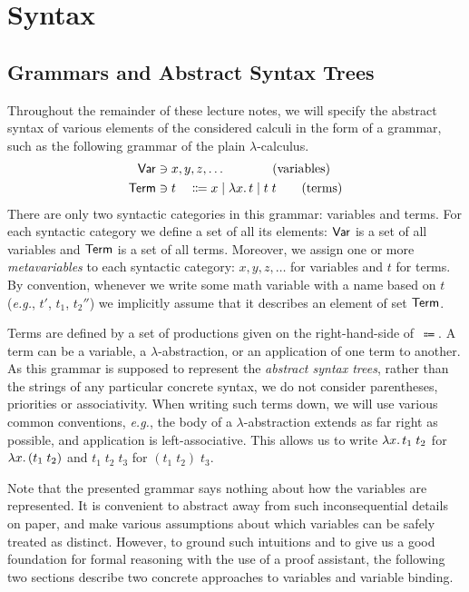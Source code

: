 \chapter{Syntax}

\section{Grammars and Abstract Syntax Trees}

Throughout the remainder of these lecture notes, we will specify the abstract
syntax of various elements of the considered calculi in the form of a grammar,
such as the following grammar of the plain $\lambda$-calculus.
\begin{alignat*}{2}
  \syncatset{Var}  &\ni x, y, z, \dots \span\span \tag{variables} \\
  \syncatset{Term} &\ni t &&\Coloneqq x \mid \lambda x\ldotp t \mid t\;t \tag{terms}
\end{alignat*}
There are only two syntactic categories in this grammar: variables and terms.
For each syntactic category we define a set of all its elements:
$\mathsf{Var}$ is a set of all variables
and $\mathsf{Term}$ is a set of all terms.
Moreover, we assign one or more \emph{metavariables}
to each syntactic category: $x, y, z, \dots$ for variables
and $t$ for terms.
By convention, whenever we write some math variable with a name based on $t$
(\emph{e.g.}, $t'$, $t_1$, $t_2''$) we implicitly assume
that it describes an element of set $\mathsf{Term}$.

Terms are defined by a set of productions given on the
right-hand-side of~$\Coloneqq$.
A term can be a variable,
a $\lambda$-abstraction, or an application of one term to another.
As this grammar is supposed to represent the \emph{abstract syntax trees},
rather than the strings of any particular concrete syntax, we do not consider
parentheses, priorities or associativity. When writing such
terms down, we will use various common conventions, \emph{e.g.}, the
body of a $\lambda$-abstraction extends as far right as possible, and
application is left-associative. This allows us to write
$\lambda x\ldotp t_1\;t_2$ for $\lambda x\ldotp (t_1\;t_2)$
and $t_1\;t_2\;t_3$ for $(t_1\;t_2)\;t_3$.

Note that the presented grammar says nothing about how the variables are
represented. It is convenient to abstract away from such
inconsequential details on paper, and make various assumptions about which
variables can be safely treated as distinct. However, to ground such
intuitions and to give us a good foundation for formal reasoning with
the use of a proof assistant, the following two sections describe
two concrete approaches to variables and variable binding.

